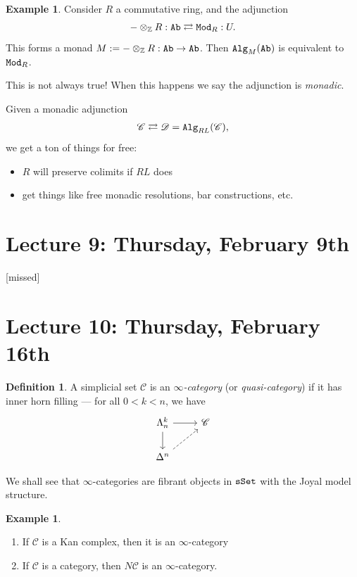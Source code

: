 \documentclass[12pt]{amsart}
\theoremstyle{definition}
\newtheorem{definition}[theorem]{Definition}
\newtheorem{example}[theorem]{Example}
\begin{document}
\begin{example} Consider $R$ a commutative ring, and the adjunction
\begin{align*}
    - \otimes_{\mathbb{Z}} R: \texttt{Ab} \rightleftarrows \texttt{Mod}_R: U.
\end{align*}
This forms a monad $M:=- \otimes_{\mathbb{Z}} R : \texttt{Ab} \to \texttt{Ab}$. Then $\texttt{Alg}_M(\texttt{Ab})$ is equivalent to $\texttt{Mod}_R$.
\end{example}

This is not always true! When this happens we say the adjunction is \textit{monadic}.

Given a monadic adjunction
\begin{align*}
    \mathscr{C} \rightleftarrows \mathscr{D} = \texttt{Alg}_{RL}(\mathscr{C}),
\end{align*}
we get a ton of things for free:
\begin{itemize}
    \item $R$ will preserve colimits if $RL$ does
    \item get things like free monadic resolutions, bar constructions, etc.
\end{itemize}

\section{Lecture 9: Thursday, February 9th}

[missed]

\section{Lecture 10: Thursday, February 16th}

\begin{definition} A simplicial set $\mathscr{C}$ is an $\infty$\textit{-category} (or \textit{quasi-category}) if it has inner horn filling --- for all $0 < k < n$, we have
\[ \begin{tikzcd}
    \Lambda_n^k\rar\dar & \mathscr{C}\\
    \Delta^n\ar[ur,dashed] & 
\end{tikzcd} \]
\end{definition}

We shall see that $\infty$-categories are fibrant objects in $\texttt{sSet}$ with the Joyal model structure.

\begin{example} $\ $
\begin{enumerate}
    \item If $\mathscr{C}$ is a Kan complex, then it is an $\infty$-category
    \item If $\mathscr{C}$ is a category, then $N\mathscr{C}$ is an $\infty$-category.
\end{enumerate}
\end{example}
\end{document}
